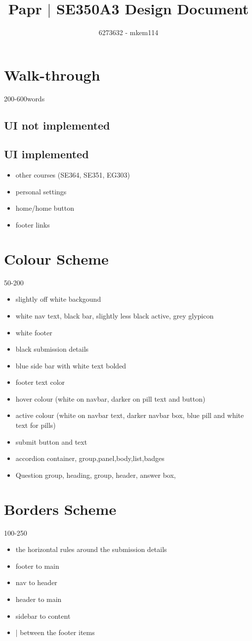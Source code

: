 \documentclass[10pt,a4paper]{article}
\author{6273632 - mkem114}
\title{Papr $|$ SE350A3 Design Document}
\begin{document}
\maketitle
\section{Walk-through}
200-600words
\subsection{UI not implemented}
\subsection{UI implemented}
\begin{itemize}
	\item other courses (SE364, SE351, EG303)
	\item personal settings
	\item home/home button
	\item footer links
\end{itemize}
\section{Colour Scheme}
50-200
\begin{itemize}
	\item slightly off white backgound
	\item white nav text, black bar, slightly less black active, grey glypicon
	\item white footer
	\item black submission details
	\item blue side bar with white text bolded
	\item footer text color
	\item hover colour (white on navbar, darker on pill text and button)
	\item active colour (white on navbar text, darker navbar box, blue pill and white text for pills)
	\item submit button and text
	\item accordion container, group,panel,body,list,badges
	\item Question group, heading, group, header, answer box, 
\end{itemize}
\section{Borders Scheme}
100-250
\begin{itemize}
	\item the horizontal rules around the submission details
	\item footer to main
	\item nav to header
	\item header to main
	\item sidebar to content
	\item | between the footer items
\end{itemize}
\end{document}
